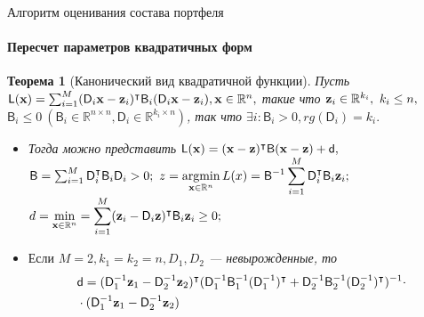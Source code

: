 \documentclass[1pt]{beamer}
\newtheorem{rustheorem}{Теорема }
\DeclareMathOperator*{\argmin}{argmin}
\let\T\intercal
\def\msf_#1{\mathsf{#1}}
\def\bo_#1{\bold{#1}}
\begin{document}
\begin{frame}{Алгоритм оценивания состава портфеля}
\framesubtitle{Пересчет параметров квадратичных форм}
\begin{rustheorem}[Канонический вид квадратичной функции]
	Пусть $\msf_L(\bo_x) = \sum_{i=1}^M(\msf_D_i\bo_x - \bo_z_i)^\T\msf_B_i(\msf_D_i\bo_x - \bo_z_i), \bo_x\in\mathbb{R}^n,$ такие что $\bo_z_i\in\mathbb{R}^{k_i},\ k_i\leq n,$\\
		$\msf_B_i\leq 0\  (\msf_B_i\in\mathbb{R}^{n\times n},\msf_D_i\in\mathbb{R}^{k_i\times n})$, так что $\exists i: \msf_B_i>0, rg(\msf_D_i)=k_i.$\\
\begin{itemize}
\item Тогда можно представить $\msf_L(\bo_x) = (\bo_x  - \bo_z)^\T\msf_B(\bo_x-\bo_z)+\msf_d,$\\
$\msf_B = \sum_{i=1}^M \msf_D_i^\T\msf_B_i\msf_D_i>0;\ z=\displaystyle\argmin_{\bo_x\in\mathbb{R}^n}L(x)={\msf_B}^{-1}\sum_{i=1}^M
		\msf_D_i^\T\msf_B_i\bo_z_i;$\\
$d = \displaystyle\min_{\bo_x\in\mathbb{R}^n}=\sum_{i=1}^M(\bo_z_i-\msf_D_i\bo_z)^\T\msf_B_i\bo_z_i\geq0;$\\
\item $\text{Если }M=2, k_1=k_2=n, D_1, D_2$ --- невырожденные, то
\begin{align*}
&\msf_d=(\msf_D_1^{-1}\bo_z_1-\msf_D_2^{-1}\bo_z_2)^\T(\msf_D_1^{-1}\msf_B_1^{-1}(\msf_D_1^{-1})^\T+\msf_D_2^{-1}\msf_B_2^{-1}(\msf_D_2^{-1})^\T)^{-1}\cdot\\
		&\cdot(\msf_D_1^{-1}\bo_z_1-\msf_D_2^{-1}\bo_z_2)
\end{align*}
\end{itemize}
\end{rustheorem}
\end{frame}
\end{document}

